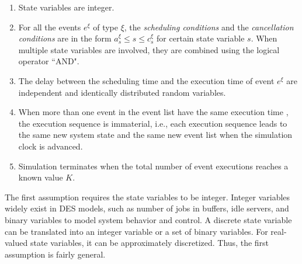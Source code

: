 \documentclass[]{interact}
\theoremstyle{plain}%
\theoremstyle{definition}
\theoremstyle{remark}
\begin{document}
\begin{enumerate}
	\item State variables are integer.
	\item For all the events $e^{\xi}$ of type $\xi$, the \textit{scheduling conditions} and the \textit{cancellation conditions} are in the form $a^{\xi}_s\le s \le c^{\xi}_s$ for certain state variable $s$. When multiple state variables are involved, they are combined using the logical operator ``AND".
	\item The delay between the scheduling time and the execution time of event $e^{\xi}$ are independent and identically distributed random variables. %
	\item When more than one event in the event list have the same execution time%
	, the execution sequence is immaterial, i.e., each execution sequence leads to the same new system state and the same new event list when the simulation clock is advanced.	
	\item Simulation terminates when the total number of event executions reaches a known value $K$.
\end{enumerate}

The first assumption requires the state variables to be integer. Integer variables widely exist in DES models, such as number of jobs in buffers, idle servers, and binary variables to model system behavior and control. A discrete state variable can be translated into an integer variable or a set of binary variables. For real-valued state variables, it can be approximately discretized. Thus, the first assumption is fairly general.
\end{document}
